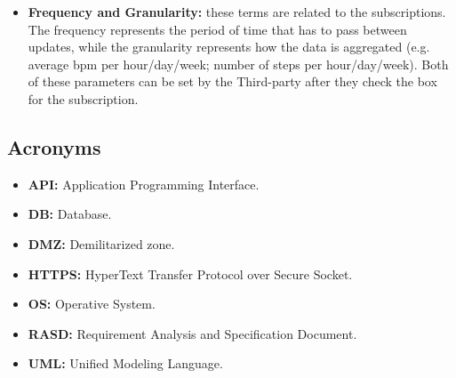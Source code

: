 \begin{itemize}
            \item \textbf{Frequency and Granularity:} these terms are related to the subscriptions. The frequency represents the period of time that has to pass between updates, while the granularity represents how the data is aggregated (e.g. average bpm per hour/day/week; number of steps per hour/day/week). Both of these parameters can be set by the Third-party after they check the box for the subscription.
        \end{itemize}
    
    \subsection{Acronyms}
        \begin{itemize}
            \item \textbf{API:} Application Programming Interface.
            
            \item \textbf{DB:} Database.
            
            \item \textbf{DMZ:} Demilitarized zone.

            \item \textbf{HTTPS:} HyperText Transfer Protocol over Secure Socket.

            \item \textbf{OS:} Operative System.

            \item \textbf{RASD:} Requirement Analysis and Specification Document.
            
            \item \textbf{UML:} Unified Modeling Language.
        \end{itemize}
        
